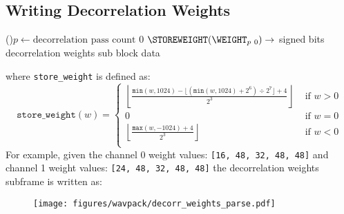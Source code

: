 {\subsection{Writing Decorrelation Weights}
\label{wavpack:write_decorr_weights}
\For(){$p \leftarrow \text{decorrelation pass count}$ \emph{\KwDownTo}0}{
  $\texttt{\STOREWEIGHT}(\text{\WEIGHT}_{p~0}) \rightarrow$  signed bits\;
}
\Return decorrelation weights sub block data\;
\EALGORITHM
\par
\noindent
where \texttt{store\_weight} is defined as:
\begin{equation*}
\texttt{store\_weight}(w) =
\begin{cases}
\left\lfloor\frac{\texttt{min}(w, 1024) - \lfloor(\texttt{min}(w,1024) + 2 ^ 6) \div 2 ^ 7\rfloor + 4}{2 ^ 3}\right\rfloor & \text{ if } w > 0 \\
0 & \text{ if } w = 0 \\
\left\lfloor \frac{\texttt{max}(w, -1024) + 4}{2 ^ 3} \right\rfloor & \text{ if } w < 0 \\
\end{cases}
\end{equation*}
For example, given the channel 0 weight values: \texttt{[16, 48, 32, 48, 48]}
\newline
and channel 1 weight values: \texttt{[24, 48, 32, 48, 48]}
\newline
the decorrelation weights subframe is written as:
\begin{figure}[h]
\texttt{[image: figures/wavpack/decorr\_weights\_parse.pdf]}
\end{figure}

\clearpage

}
